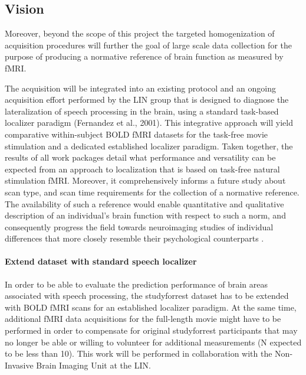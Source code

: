 \subsection{Vision}
%
Moreover, beyond the scope of this project the targeted homogenization of
acquisition procedures will further the goal of large scale data collection for
the purpose of producing a normative reference of brain function as measured by
fMRI.

The acquisition will be integrated into an existing protocol and an ongoing
acquisition effort performed by the LIN group that is designed to diagnose the
lateralization of speech processing in the brain, using a standard task-based
localizer paradigm (Fernandez et al., 2001).
%
This integrative approach will yield comparative within-subject BOLD fMRI
datasets for the task-free movie stimulation and a dedicated established
localizer paradigm.
%
Taken together, the results of all work packages detail what performance and
versatility can be expected from an approach to localization that is based on
task-free natural stimulation fMRI.
%
Moreover, it comprehensively informs a future study about scan type, and scan
time requirements for the collection of a normative reference.
%
The availability of such a reference would enable quantitative and qualitative
description of an individual's brain function with respect to such a norm, and
consequently progress the field towards neuroimaging studies of individual
differences that more closely resemble their psychological counterparts
\citep{dubois2016building}.

\paragraph{Extend dataset with standard speech localizer}
%
In order to be able to evaluate the prediction performance of brain areas
associated with speech processing, the studyforrest dataset has to be extended
with BOLD fMRI scans for an established localizer paradigm.
%
At the same time, additional fMRI data acquisitions for the full-length movie
might have to be performed in order to compensate for original studyforrest
participants that may no longer be able or willing to volunteer for additional
measurements (N expected to be less than 10).
%
This work will be performed in
collaboration with the Non-Invasive Brain Imaging Unit at the LIN.



